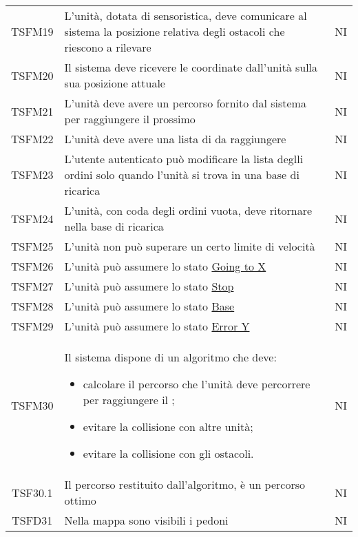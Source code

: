 \begin{longtable}[h!] { c  m{12cm} c}
		TSFM19   & L'unità, dotata di sensoristica, deve comunicare al sistema la posizione relativa degli ostacoli che riescono a rilevare & NI \\

		TSFM20 & Il sistema deve ricevere le coordinate dall'unità sulla sua posizione attuale & NI \\

		TSFM21 & L'unità deve avere un percorso fornito dal sistema per raggiungere il prossimo \glock{POI} & NI \\

		TSFM22 & L'unità deve avere una lista di \glock{POI} da raggiungere & NI \\

		TSFM23  & L'utente autenticato può modificare la lista deglli ordini solo quando l'unità si trova in una base di ricarica & NI \\

		TSFM24  & L'unità, con coda degli ordini vuota, deve ritornare nella base di ricarica & NI \\

		TSFM25  & L'unità non può superare un certo limite di velocità & NI \\

		TSFM26 & L'unità può assumere lo stato \underline{Going to X} & NI \\
		TSFM27 & L'unità può assumere lo stato \underline{Stop} & NI \\
		TSFM28 & L'unità può assumere lo stato \underline{Base} & NI \\
		TSFM29 & L'unità può assumere lo stato \underline{Error Y} & NI \\
		TSFM30  & Il sistema dispone di un algoritmo che deve:
				\begin{itemize}
					\item calcolare il percorso che l'unità deve percorrere per raggiungere il \glock{POI};
					\item evitare la collisione con altre unità;
					\item evitare la collisione con gli ostacoli.
				\end{itemize}
										& NI \\

		TSF30.1  & Il percorso restituito dall'algoritmo, è un percorso ottimo & NI\\

		TSFD31 & Nella mappa sono visibili i pedoni & NI \\


\end{longtable}
